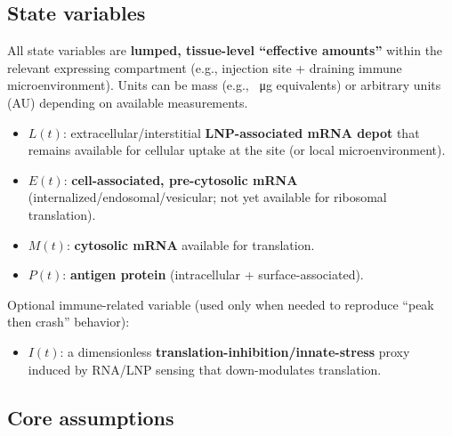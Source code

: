 \subsection*{State variables}
All state variables are \textbf{lumped, tissue-level ``effective amounts''} within the relevant expressing compartment (e.g., injection site + draining immune microenvironment). Units can be mass (e.g., \qty{}{\micro\gram} equivalents) or arbitrary units (AU) depending on available measurements.

\begin{itemize}
    \item $L(t)$: extracellular/interstitial \textbf{LNP-associated mRNA depot} that remains available for cellular uptake at the site (or local microenvironment).
    \item $E(t)$: \textbf{cell-associated, pre-cytosolic mRNA} (internalized/endosomal/vesicular; not yet available for ribosomal translation).
    \item $M(t)$: \textbf{cytosolic mRNA} available for translation.
    \item $P(t)$: \textbf{antigen protein} (intracellular + surface-associated).
\end{itemize}

Optional immune-related variable (used only when needed to reproduce ``peak then crash'' behavior):

\begin{itemize}
    \item $I(t)$: a dimensionless \textbf{translation-inhibition/innate-stress} proxy induced by RNA/LNP sensing that down-modulates translation.
\end{itemize}

\subsection*{Core assumptions}

